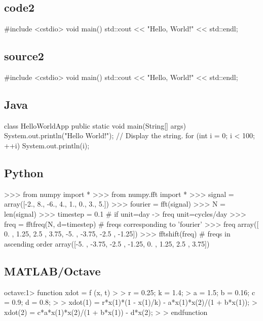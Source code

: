\documentclass[../main]{subfiles}
\begin{document}
\subsection{code2}
\begin{code2}[language=c++]
#include <cstdio>
void main() {
    std::cout << "Hello, World!" << std::endl;
}
\end{code2}

\subsection{source2}
\begin{source2}[language=c++]
#include <cstdio>
void main() {
    std::cout << "Hello, World!" << std::endl;
}
\end{source2}

\subsection{Java}
\begin{pre}[language=java]
class HelloWorldApp {
    public static void main(String[] args) {
        System.out.println("Hello World!"); // Display the string.
        for (int i = 0; i < 100; ++i) {
            System.out.println(i);
        }
    }
}
\end{pre}

\subsection{Python}
\begin{pre}[language=python]
>>> from numpy import *
>>> from numpy.fft import *
>>> signal = array([-2., 8., -6., 4., 1., 0., 3., 5.])
>>> fourier = fft(signal)
>>> N = len(signal)
>>> timestep = 0.1 # if unit=day -> freq unit=cycles/day
>>> freq = fftfreq(N, d=timestep) # freqs corresponding to 'fourier'
>>> freq
array([ 0. , 1.25, 2.5 , 3.75, -5. , -3.75, -2.5 , -1.25])
>>> fftshift(freq) # freqs in ascending order
array([-5. , -3.75, -2.5 , -1.25, 0. , 1.25, 2.5 , 3.75])
\end{pre}

\subsection{MATLAB/Octave}
\begin{pre}[language=octave]
octave:1> function xdot = f (x, t)
>
>  r = 0.25; k = 1.4;
>  a = 1.5; b = 0.16; c = 0.9; d = 0.8;
>
>  xdot(1) = r*x(1)*(1 - x(1)/k) - a*x(1)*x(2)/(1 + b*x(1));
>  xdot(2) = c*a*x(1)*x(2)/(1 + b*x(1)) - d*x(2);
>
> endfunction
\end{pre}
\end{document}
